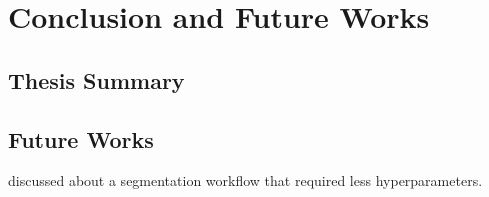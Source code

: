 \chapter{Conclusion and Future Works}

\section{Thesis Summary}

\section{Future Works}

\citep{6346433} discussed about a segmentation workflow that required less hyperparameters.